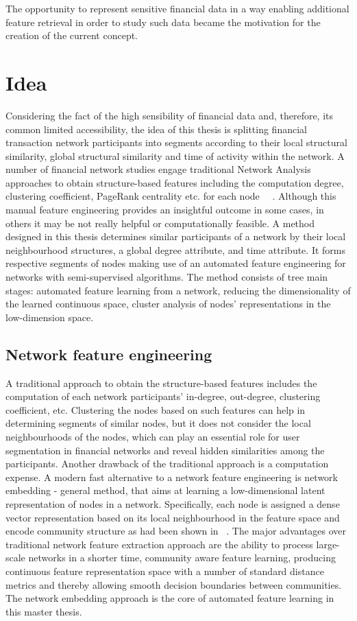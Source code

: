 The opportunity to represent sensitive financial data in a way enabling additional feature retrieval in order to study such data became the motivation for the creation of the current concept.

\section{Idea}
Considering the fact of the high sensibility of financial data and, therefore, its common limited accessibility, the idea of this thesis is splitting financial transaction network participants into segments according to their local structural similarity, global structural similarity and time of activity within the network. 
A number of financial network studies engage traditional Network Analysis approaches to obtain structure-based features including the computation degree, clustering coefficient, PageRank centrality etc. for each node~\cite{ContagionFinNets} ~\cite{StatisticAnalysisFinNetworks}. Although this manual feature engineering provides an insightful outcome in some cases, in others it may be not really helpful or computationally feasible. A method designed in this thesis determines similar participants of a network by their local neighbourhood structures, a global degree attribute, and time attribute. It forms respective segments of nodes making use of an automated feature engineering for networks with semi-supervised algorithms. The method consists of tree main stages: automated feature learning from a network, reducing the dimensionality of the learned continuous space, cluster analysis of nodes' representations in the low-dimension space. 

\subsection{Network feature engineering}
A traditional approach to obtain the structure-based features includes the computation of each network participants' in-degree, out-degree, clustering coefficient, etc. Clustering the nodes based on such features can help in determining segments of similar nodes, but it does not consider the local neighbourhoods of the nodes, which can play an essential role for user segmentation in financial networks and reveal hidden similarities among the participants. Another drawback of the traditional approach is a computation expense. A modern fast alternative to a network feature engineering is network embedding - general method, that aims at learning a low-dimensional latent representation of nodes in a network. Specifically, each node is assigned a dense vector representation based on its local neighbourhood in the feature space and encode community structure as had been shown in ~\cite{chen2018tutorial}. The major advantages over traditional network feature extraction approach are the ability to process large-scale networks in a shorter time, community aware feature learning, producing continuous feature representation space with a number of standard distance metrics and thereby allowing smooth decision boundaries between communities. The network embedding approach is the core of automated feature learning in this master thesis.

